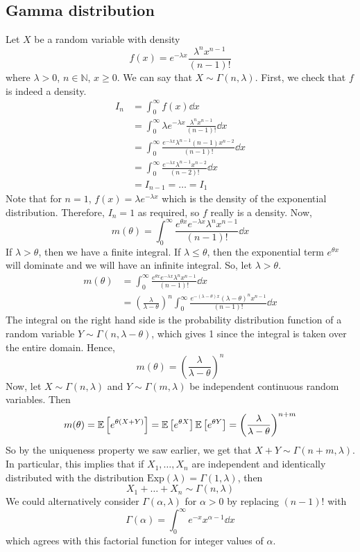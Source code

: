 \subsection{Gamma distribution}
Let \(X\) be a random variable with density
\[
	f(x) = e^{-\lambda x}\frac{\lambda^n x^{n-1}}{(n-1)!}
\]
where \(\lambda > 0\), \(n \in \mathbb N\), \(x \geq 0\).
We can say that \(X \sim \Gamma(n, \lambda)\).
First, we check that \(f\) is indeed a density.
\begin{align*}
	I_n & = \int_0^\infty f(x) \dd{x}                                                     \\
	    & = \int_0^\infty \lambda e^{-\lambda x} \frac{\lambda^n x^{n-1}}{(n-1)!} \dd{x}  \\
	    & = \int_0^\infty \frac{e^{-\lambda x} \lambda^{n-1} (n-1) x^{n-2}}{(n-1)!}\dd{x} \\
	    & = \int_0^\infty \frac{e^{-\lambda x} \lambda^{n-1} x^{n-2}}{(n-2)!}\dd{x}       \\
	    & = I_{n-1} = \dots = I_1
\end{align*}
Note that for \(n=1\), \(f(x) = \lambda e^{-\lambda x}\) which is the density of the exponential distribution.
Therefore, \(I_n = 1\) as required, so \(f\) really is a density.
Now,
\[
	m(\theta) = \int_0^\infty \frac{e^{\theta x} e^{-\lambda x} \lambda^n x^{n-1}}{(n-1)!} \dd{x}
\]
If \(\lambda > \theta\), then we have a finite integral.
If \(\lambda \leq \theta\), then the exponential term \(e^{\theta x}\) will dominate and we will have an infinite integral.
So, let \(\lambda > \theta\).
\begin{align*}
	m(\theta) & = \int_0^\infty \frac{e^{\theta x} e^{-\lambda x} \lambda^n x^{n-1}}{(n-1)!} \dd{x}                                                            \\
	          & = \left( \frac{\lambda}{\lambda - \theta} \right)^n \int_0^\infty \frac{e^{-(\lambda - \theta) x} (\lambda - \theta)^n x^{n-1}}{(n-1)!} \dd{x}
\end{align*}
The integral on the right hand side is the probability distribution function of a random variable \(Y \sim \Gamma(n, \lambda - \theta)\), which gives 1 since the integral is taken over the entire domain.
Hence,
\[
	m(\theta) = \left( \frac{\lambda}{\lambda - \theta} \right)^n
\]
Now, let \(X \sim \Gamma(n, \lambda)\) and \(Y \sim \Gamma(m, \lambda)\) be independent continuous random variables.
Then
\[
	m(\theta) = \mathbb{E}\left[{e^{\theta(X + Y)}}\right] = \mathbb{E}\left[{e^{\theta X}}\right] \mathbb{E}\left[{e^{\theta Y}}\right] = \qty(\frac{\lambda}{\lambda - \theta})^{n+m}
\]
So by the uniqueness property we saw earlier, we get that \(X+Y \sim \Gamma(n+m, \lambda)\).
In particular, this implies that if \(X_1, \dots, X_n\) are independent and identically distributed with the distribution \(\mathrm{Exp}(\lambda) = \Gamma(1, \lambda)\), then
\[
	X_1 + \dots + X_n \sim \Gamma(n, \lambda)
\]
We could alternatively consider \(\Gamma(\alpha, \lambda)\) for \(\alpha > 0\) by replacing \((n-1)!
\) with
\[
	\Gamma(\alpha) = \int_0^\infty e^{-x} x^{\alpha - 1} \dd{x}
\]
which agrees with this factorial function for integer values of \(\alpha\).

